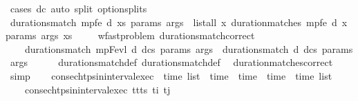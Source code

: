 \begin{isabellebody}
\ {\isacharparenleft}{\kern0pt}cases\ dc{\isacharparenright}{\kern0pt}\ {\isacharparenleft}{\kern0pt}auto\ split{\isacharcolon}{\kern0pt}\ option{\isachardot}{\kern0pt}splits{\isacharparenright}{\kern0pt}%
\endisatagproof
{\isafoldproof}%
%
\isadelimproof
\isanewline
%
\endisadelimproof
\ \ \isanewline
\ \ \isamarkupfalse%
\ {\isachardoublequoteopen}durations{\isacharunderscore}{\kern0pt}match{\isacharprime}{\kern0pt}\ mp{\isacharunderscore}{\kern0pt}fe\ d\ xs\ params\ args\ {\isacharequal}{\kern0pt}\ list{\isacharunderscore}{\kern0pt}all\ {\isacharparenleft}{\kern0pt}{\isasymlambda}x{\isachardot}{\kern0pt}\ duration{\isacharunderscore}{\kern0pt}matches{\isacharprime}{\kern0pt}\ mp{\isacharunderscore}{\kern0pt}fe\ d\ x\ params\ args{\isacharparenright}{\kern0pt}\ xs{\isachardoublequoteclose}\isanewline
\isanewline
\ \ \isamarkupfalse%
\ {\isacharparenleft}{\kern0pt}\ wf{\isacharunderscore}{\kern0pt}ast{\isacharunderscore}{\kern0pt}problem{\isacharparenright}{\kern0pt}\ durations{\isacharunderscore}{\kern0pt}match{\isacharprime}{\kern0pt}{\isacharunderscore}{\kern0pt}correct{\isacharcolon}{\kern0pt}\ \ \ \ \isanewline
\ \ \ \ {\isachardoublequoteopen}durations{\isacharunderscore}{\kern0pt}match{\isacharprime}{\kern0pt}\ mp{\isacharunderscore}{\kern0pt}Fevl\ d\ dcs\ params\ args\ {\isasymlongleftrightarrow}\ durations{\isacharunderscore}{\kern0pt}match\ d\ dcs\ params\ args{\isachardoublequoteclose}\isanewline
%
\isadelimproof
\ \ \ \ %
\endisadelimproof
%
\isatagproof
{}\isamarkupfalse%
\ durations{\isacharunderscore}{\kern0pt}match{\isacharunderscore}{\kern0pt}def\ durations{\isacharunderscore}{\kern0pt}match{\isacharprime}{\kern0pt}{\isacharunderscore}{\kern0pt}def\ \isamarkupfalse%
\ duration{\isacharunderscore}{\kern0pt}matches{\isacharprime}{\kern0pt}{\isacharunderscore}{\kern0pt}correct\ \isamarkupfalse%
\ simp%
\endisatagproof
{\isafoldproof}%
%
\isadelimproof
\isanewline
%
\endisadelimproof
\isanewline
\ \ \isamarkupfalse%
\ consec{\isacharunderscore}{\kern0pt}htps{\isacharunderscore}{\kern0pt}in{\isacharunderscore}{\kern0pt}interval{\isacharunderscore}{\kern0pt}exec\ {\isacharcolon}{\kern0pt}{\isacharcolon}{\kern0pt}\ {\isachardoublequoteopen}time\ list\ {\isasymRightarrow}\ time\ {\isasymRightarrow}\ time\ {\isasymRightarrow}\ {\isacharparenleft}{\kern0pt}time\ {\isasymtimes}\ time{\isacharparenright}{\kern0pt}\ list{\isachardoublequoteclose}\ \isanewline
\ \ \ \ {\isachardoublequoteopen}consec{\isacharunderscore}{\kern0pt}htps{\isacharunderscore}{\kern0pt}in{\isacharunderscore}{\kern0pt}interval{\isacharunderscore}{\kern0pt}exec\ {\isacharparenleft}{\kern0pt}t{\isacharhash}{\kern0pt}t{\isacharprime}{\kern0pt}{\isacharhash}{\kern0pt}ts{\isacharparenright}{\kern0pt}\ t\isactrlsub i\ t\isactrlsub j\ {\isacharequal}{\kern0pt}\ \isanewline

\end{isabellebody}
